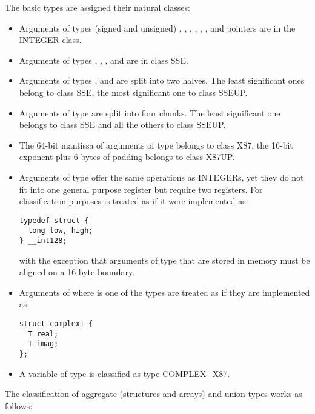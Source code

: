 The basic types are assigned their natural classes:
\begin{itemize}
\item Arguments of types (signed and unsigned) , ,
  , , , , and
  pointers are in the INTEGER class.
\item Arguments of types , , ,
   and  are in class SSE.
\item Arguments of types , 
  and  are split into two halves.  The least significant
  ones belong to class SSE, the most significant one to class SSEUP.
\item Arguments of type  are split into four \eightbyte
  chunks.  The least significant one belongs to class SSE and all the
  others to class SSEUP.
\item The 64-bit mantissa of arguments of type 
  belongs to class X87, the 16-bit exponent plus 6 bytes of padding
  belongs to class X87UP.
\item Arguments of type  offer the same operations as
INTEGERs, yet they do not fit into one general purpose register but
require two registers.  For
classification purposes  is treated as if it
were implemented as:
\begin{verbatim}
typedef struct {
  long low, high;
} __int128;
\end{verbatim}
with the exception that arguments of type  that are
stored in memory must be aligned on a 16-byte boundary.

\item Arguments of  where  is one of the types
   are treated as if they are
  implemented as:
\begin{verbatim}
struct complexT {
  T real;
  T imag;
};
\end{verbatim}
\item A variable of type  is classified as
  type COMPLEX\_X87.
\end{itemize}


The classification of aggregate (structures and arrays) and union
types works as follows:

